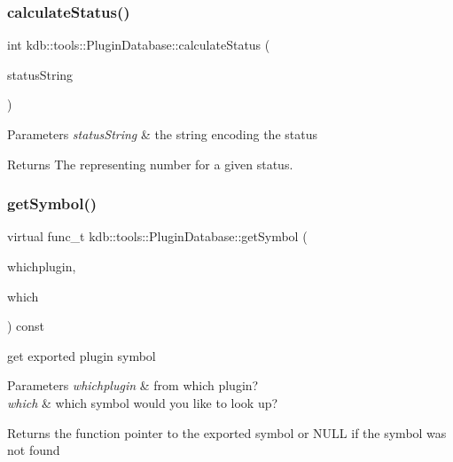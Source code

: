 \subsubsection{\texorpdfstring{calculateStatus()}{calculateStatus()}}
{\footnotesize\ttfamily int kdb\+::tools\+::\+Plugin\+Database\+::calculate\+Status (\begin{DoxyParamCaption}\item[{std\+::string}]{status\+String }\end{DoxyParamCaption})\hspace{0.3cm}{\ttfamily [static]}}


\begin{DoxyParams}{Parameters}
{\em status\+String} & the string encoding the status\\
\hline
\end{DoxyParams}
\begin{DoxyReturn}{Returns}
The representing number for a given status. 
\end{DoxyReturn}
\mbox{\label{classkdb_1_1tools_1_1PluginDatabase_a87b5ef6ee66ce1ad46cc590a2b60b9fa}} 
\subsubsection{\texorpdfstring{getSymbol()}{getSymbol()}}
{\footnotesize\ttfamily virtual func\+\_\+t kdb\+::tools\+::\+Plugin\+Database\+::get\+Symbol (\begin{DoxyParamCaption}\item[{\mbox{\hyperlink{classkdb_1_1tools_1_1PluginSpec}{Plugin\+Spec}} const \&}]{whichplugin,  }\item[{std\+::string const \&}]{which }\end{DoxyParamCaption}) const\hspace{0.3cm}{\ttfamily [pure virtual]}}



get exported plugin symbol 


\begin{DoxyParams}{Parameters}
{\em whichplugin} & from which plugin? \\
\hline
{\em which} & which symbol would you like to look up?\\
\hline
\end{DoxyParams}
\begin{DoxyReturn}{Returns}
the function pointer to the exported symbol or N\+U\+LL if the symbol was not found 
\end{DoxyReturn}



